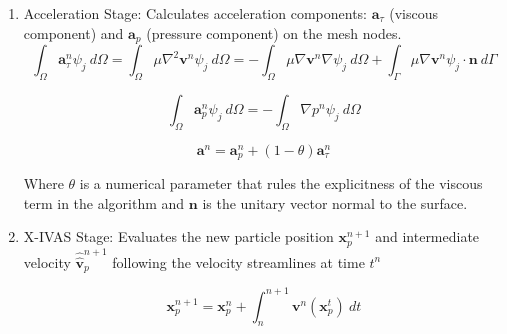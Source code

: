 \begin{enumerate}
  \item Acceleration Stage: Calculates acceleration components: $\mathbf{a}_{\tau}$ (viscous component) and $\mathbf{a}_{p}$ (pressure component) on the mesh nodes.
  \begin{equation}\label{Step1a}
\int_{\Omega}\mathbf{a}^{n}_{\tau}\psi_j\ d\Omega=\int_{\Omega}\mu \nabla^{2}\mathbf{v}^{n} \psi_j\ d\Omega=-\int_{\Omega}\mu \nabla\mathbf{v}^{n} \nabla \psi_j\ d\Omega + \int_{\Gamma}\mu \nabla\mathbf{v}^{n} \psi_j \cdot \mathbf{n} \ d\Gamma
\end{equation}

\begin{equation}\label{Step1b}
\int_{\Omega}\mathbf{a}^{n}_{p}\psi_j\ d\Omega=-\int_{\Omega}\nabla p^{n} \psi_j\ d\Omega
\end{equation}

\begin{equation}\label{Step1c}
\mathbf{a}^{n}=\mathbf{a}^{n}_{p} + (1-\theta)\mathbf{a}^{n}_{\tau}
\end{equation}

Where $\theta$ is a numerical parameter that rules the explicitness of the viscous term in the algorithm and $\mathbf{n}$ is the unitary vector normal to the surface.

  \item X-IVAS Stage: Evaluates the new particle position $\mathbf{x}^{n+1}_{p}$ and intermediate velocity $\widehat{\widehat{\mathbf{v}}}^{n+1}_{p}$ following the velocity streamlines at time $t^n$

  \begin{equation}\label{Step2a}
 \mathbf{x}^{n+1}_{p}=\mathbf{x}^{n}_{p} + \int_{n}^{n+1} \mathbf{v}^{n}(\mathbf{x}_p^{t}) \ dt
\end{equation}


\end{enumerate}
